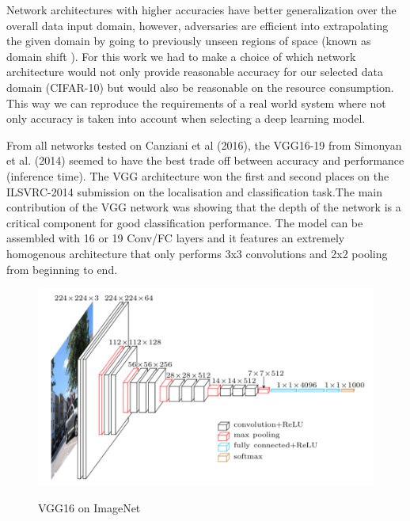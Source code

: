 Network architectures with higher accuracies have better generalization over the overall data input domain, however, adversaries are efficient into extrapolating the given domain by going to previously unseen regions of space (known as domain shift \cite{papernot2016}). For this work we had to make a choice of which network architecture would not only provide reasonable accuracy for our selected data domain (CIFAR-10) but would also be reasonable on the resource consumption. This way we can reproduce the requirements of a real world system where not only accuracy is taken into account when selecting a deep learning model.

From all networks tested on Canziani et al (2016), the VGG16-19 from Simonyan et al. (2014)  seemed to have the best trade off between accuracy and performance (inference time). The VGG architecture won the first and second places on the ILSVRC-2014 submission on the localisation and classification task.The main contribution of the VGG network was showing that the depth of the network is a critical component for good classification performance. The model can be assembled with 16 or 19 Conv/FC layers and it features an extremely homogenous architecture that only performs 3x3 convolutions and 2x2 pooling from beginning to end.

\begin{figure}[!h]
	\centering
	\includegraphics[scale=0.6]{imagenet_vgg16.png}
	\caption{VGG16 on ImageNet}
	\cite{simonyan2014very}
	\label{fig:vgg16}
\end{figure}

